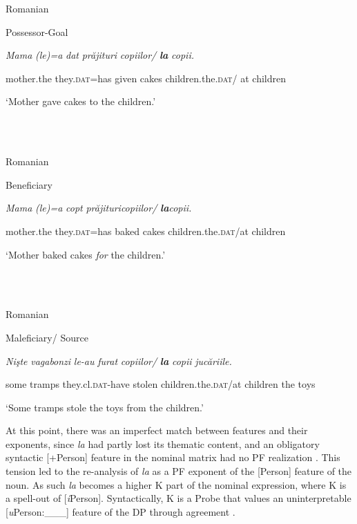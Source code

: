 \documentclass[output=paper,modfonts,nonflat]{langsci/langscibook}
\begin{document}
          Romanian

Possessor-Goal

\textit{Mama}     \textit{(le)=a}     \textit{dat}  \textit{prăjituri}   \textit{copiilor/}  \textbf{\textit{la} }\textit{copii.} 

mother.the  they.\textsc{dat}=has   given   cakes   children.the.\textsc{dat}/ at children

‘Mother gave cakes to the children.’

\ea%
    \label{ex:key:15}
    \gll\\
        \\
    \glt
    \z

          Romanian

Beneficiary

\textit{Mama}     \textit{(le)=a}     \textit{copt}  \textit{prăjituricopiilor/}  \textbf{\textit{la}}\textit{copii.}

  mother.the  they.\textsc{dat}=has   baked   cakes   children.the.\textsc{dat}/at children

  ‘Mother baked cakes \textit{for} the children.’

\ea%
    \label{ex:key:16}
    \gll\\
        \\
    \glt
    \z

          Romanian

Maleficiary/ Source

\textit{Nişte} \textit{vagabonzi} \textit{le-au}   \textit{furat}  \textit{copiilor/}  \textbf{\textit{la} }\textit{copii}  \textit{jucăriile.} 

  some tramps  they.cl.\textsc{dat-}have stolen children.the.\textsc{dat}/at children the toys

  ‘Some tramps stole the toys from the children.’

At this point, there was an imperfect match between features and their exponents, since \textit{la} had partly lost its thematic content, and an obligatory syntactic [+Person] feature in the nominal matrix had no PF realization . This tension led to the re-analysis of \textit{la} as a PF exponent of the [Person] feature of the noun. As such \textit{la} becomes a higher K part of the nominal expression, where K is a spell-out of [\textit{i}Person]. Syntactically, K is a Probe that values an uninterpretable [\textit{u}Person:\_\_\_] feature of the DP through agreement .

\ea%
    \label{ex:key:17}
    \gll\\
        \\
    \glt
    \z
\end{document}
